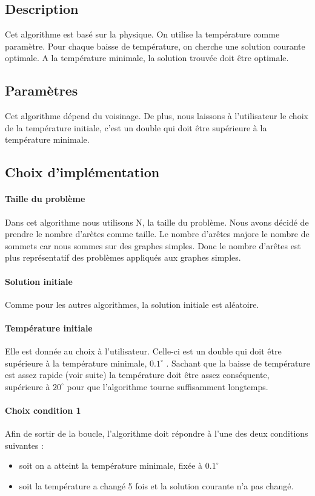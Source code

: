 \documentclass[12pt]{article}
\begin{document}
\subsection{Description}
Cet algorithme est basé sur la physique. On utilise la température comme paramètre. Pour chaque baisse de température, on cherche une solution courante optimale. A la température minimale, la solution trouvée doit être optimale.

\subsection{Paramètres}
Cet algorithme dépend du voisinage. De plus, nous laissons à l’utilisateur le choix de la température initiale, c’est un double qui doit être supérieure à la température minimale.

\subsection{Choix d'implémentation}

\paragraph{Taille du problème}
Dans cet algorithme nous utilisons N, la taille du problème. Nous avons décidé de prendre le nombre d’arètes comme taille. Le nombre d’arêtes majore le nombre de sommets car nous sommes sur des graphes simples. Donc le nombre d’arêtes est plus représentatif des problèmes appliqués aux graphes simples.

\paragraph{Solution initiale} Comme pour les autres algorithmes, la solution initiale est aléatoire.

\paragraph{Température initiale} Elle est donnée au choix à l’utilisateur. Celle-ci est un double qui doit être supérieure à la température minimale, $0.1^\circ$ . Sachant que la baisse de température est assez rapide (voir suite) la température doit être assez conséquente, supérieure à $20^\circ$ pour que l’algorithme tourne suffisamment longtemps.

\paragraph{Choix condition 1} Afin de sortir de la boucle, l’algorithme doit répondre à l’une des deux conditions suivantes :
	\begin{itemize}
    \item soit on a atteint la température minimale, fixée à $0.1^\circ$
    \item soit la température a changé 5 fois et la solution courante n’a pas changé.
    \end{itemize}
\end{document}
